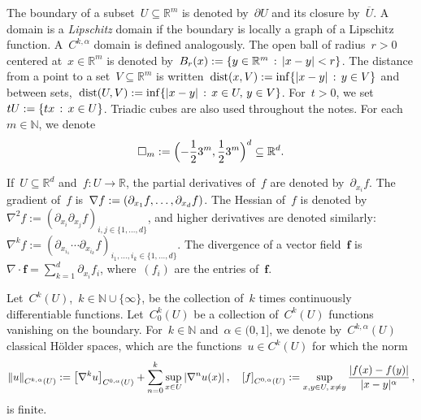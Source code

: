 \documentclass[11pt,twoside]{article} %
\let\oldsquare\square %
\renewcommand{\square}{\oldsquare}
\numberwithin{equation}{section}
\theoremstyle{definition}
\let\originalleft\left
\let\originalright\right
\renewcommand{\left}{\mathopen{}\mathclose\bgroup\originalleft}
\renewcommand{\right}{\aftergroup\egroup\originalright}
\newcommand*{\N}{\ensuremath{\mathbb{N}}}
\newcommand*{\R}{\ensuremath{\mathbb{R}}}
\newcommand*{\Rd}{\ensuremath{\mathbb{R}^d}}
\newcommand{\f}{\mathbf{f}}
\newcommand{\cu}{\square}
\DeclareMathOperator{\dist}{dist}
\begin{document}
\smallskip

The boundary of a subset~$U\subseteq \R^m$ is denoted by~$\partial U$ and its closure by~$\overline{U}$. A domain is a \emph{Lipschitz} domain if the boundary is locally a graph of a Lipschitz function. A~$C^{k,\alpha}$ domain is defined analogously.  The open ball of radius~$r>0$ centered at~$x\in\R^m$ is denoted by~$B_r(x):= \left\{ y\in\R^m\,:\, |x-y|<r \right\}$. The distance from a point to a set~$V\subseteq \R^m$ is written~$\dist(x,V):= \inf\left\{ |x-y|\,:\, y\in V\right\}$ and between sets,~$\dist(U,V):= \inf\left\{ |x-y|\,:\, x \in U,\, y\in V\right\}$.  For~$t >0$, we set~$t U:= \left\{ t x \,:\, x\in U\right\}$. Triadic cubes are also used throughout the notes. For each~$m\in\N$, we denote 
\begin{equation} 
\label{e.triadiccubes}
\cu_m := \Bigl( -\frac12 3^m, \frac12 3^m \Bigr)^d\subseteq \Rd. 
\end{equation}



If~$U\subseteq\Rd$ and~$f: U \to \R$, the partial derivatives of~$f$ are denoted by~$\partial_{x_i} f$. The gradient of~$f$ is~$\nabla f:= \left( \partial_{x_1} f ,\ldots, \partial_{x_d} f \right)$. The Hessian of~$f$ is denoted by~$\nabla^2f:= ( \partial_{x_i} \partial_{x_j} f )_{i,j\in\{1,\ldots,d\}}$, and higher derivatives are denoted similarly:~$\nabla^k f := ( \partial_{x_{i_1}}\cdots\partial_{x_{i_k}} f )_{i_1,\ldots,i_k\in\{1,\ldots,d\}}$. The divergence of a vector field~$\f$ is~$\nabla \cdot \f = \sum_{k=1}^d \partial_{x_i} f_i$, where~$(f_i)$ are the entries of~$\f$. 

\smallskip

Let~$C^k(U)$,~$k\in\N\cup\{\infty\}$, be the collection of~$k$ times continuously differentiable functions. Let~$C_0^k(U)$ be a collection of~$C^k(U)$ functions vanishing on the boundary. For~$k\in\N$ and~$\alpha \in (0,1]$, we denote by~$C^{k,\alpha}(U)$ classical H\"older spaces, which are the functions~$u\in C^k(U)$ for which the norm 
\begin{equation*} \label{}
\left\| u \right\|_{C^{k,\alpha}(U)} :=
\bigl[\nabla^ku\bigr]_{C^{0,\alpha}(U)}
+
\sum_{n=0}^k \sup_{x\in U} \, \left| \nabla^n u(x) \right| 
\,,
\quad
\left[ f \right]_{C^{0,\alpha}(U)} 
:=  \sup_{x,y\in U,\,x\neq y} \frac{ \left|  f(x) - f(y) \right|}{|x-y|^{\alpha}}\,,
\end{equation*}
is finite. 


\smallskip
\end{document}
